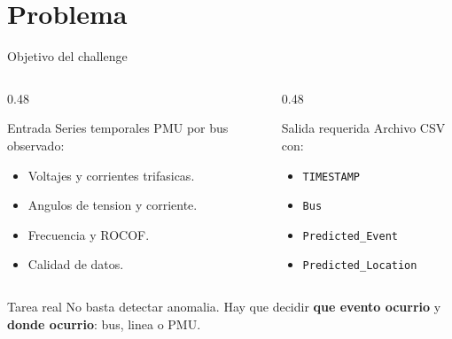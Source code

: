 \documentclass[10pt,aspectratio=169]{beamer}
\newcommand{\code}[1]{\texttt{\footnotesize #1}}
\begin{document}
\section{Problema}

\begin{frame}{Objetivo del challenge}
\small
\begin{columns}[T,totalwidth=\textwidth]
\begin{column}{0.48\textwidth}
\begin{block}{Entrada}
Series temporales PMU por bus observado:
\begin{itemize}
  \item Voltajes y corrientes trifasicas.
  \item Angulos de tension y corriente.
  \item Frecuencia y ROCOF.
  \item Calidad de datos.
\end{itemize}
\end{block}
\end{column}
\begin{column}{0.48\textwidth}
\begin{block}{Salida requerida}
Archivo CSV con:
\begin{itemize}
  \item \code{TIMESTAMP}
  \item \code{Bus}
  \item \code{Predicted\_Event}
  \item \code{Predicted\_Location}
\end{itemize}
\end{block}
\end{column}
\end{columns}
\vspace{2mm}
\begin{alertblock}{Tarea real}
No basta detectar anomalia. Hay que decidir \textbf{que evento ocurrio} y \textbf{donde ocurrio}: bus, linea o PMU.
\end{alertblock}
\end{frame}
\end{document}
